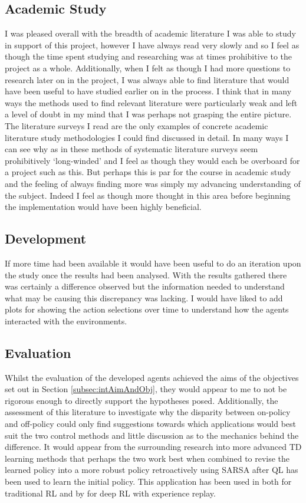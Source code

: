 \documentclass[hidelinks,journal]{IEEEtran}
\begin{document}
\subsection{Academic Study}
\label{subsec:dissStud}
I was pleased overall with the breadth of academic literature I was able to study in support of this project, however I have always read very slowly and so I feel as though the time spent studying and researching was at times prohibitive to the project as a whole. Additionally, when I felt as though I had more questions to research later on in the project, I was always able to find literature that would have been useful to have studied earlier on in the process. I think that in many ways the methods used to find relevant literature were particularly weak and left a level of doubt in my mind that I was perhaps not grasping the entire picture. The literature surveys I read are the only examples of concrete academic literature study methodologies \parencite{Kober13, Busoniu08, Kaelbling96, Wirth17} I could find discussed in detail. In many ways I can see why as in \textcite{Ahmad17} these methods of systematic literature surveys seem prohibitively ‘long-winded’ and I feel as though they would each be overboard for a project such as this. But perhaps this is par for the course in academic study and the feeling of always finding more was simply my advancing understanding of the subject. Indeed I feel as though more thought in this area before beginning the implementation would have been highly beneficial.
\subsection{Development}
\label{subsec:dissDevel}
If more time had been available it would have been useful to do an iteration upon the study once the results had been analysed. With the results gathered there was certainly a difference observed but the information needed to understand what may be causing this discrepancy was lacking. I would have liked to add plots for showing the action selections over time to understand how the agents interacted with the environments.
\subsection{Evaluation}
\label{subsec:dissEval}
Whilst the evaluation of the developed agents achieved the aims of the objectives set out in Section \ref{subsec:intAimAndObj}, they would appear to me to not be rigorous enough to directly support the hypotheses posed. Additionally, the assessment of this literature to investigate why the disparity between on-policy and off-policy could only find suggestions towards which applications would best suit the two control methods and little discussion as to the mechanics behind the difference. It would appear from the surrounding research into more advanced TD learning methods that perhaps the two work best when combined \cite{Wang13, Zhi-Xiong18} to revise the learned policy into a more robust policy retroactively using SARSA after QL has been used to learn the initial policy. This application has been used in both \textcite{Wang13} for traditional RL and by \textcite{Zhi-Xiong18} for deep RL with experience replay.
\end{document}
